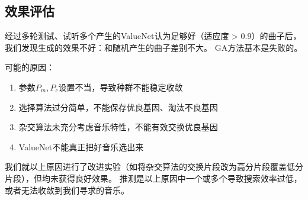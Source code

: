 \documentclass{ctexart}
\begin{document}
\subsection{效果评估}
经过多轮测试、试听多个产生的ValueNet认为足够好（适应度 > 0.9）的曲子后，我们发现生成的效果不好：和随机产生的曲子差别不大。
GA方法基本是失败的。

可能的原因：
\begin{enumerate}[nosep]
  \item 参数$P_m,P_c$设置不当，导致种群不能稳定收敛
  \item 选择算法过分简单，不能保存优良基因、淘汰不良基因
  \item 杂交算法未充分考虑音乐特性，不能有效交换优良基因
  \item ValueNet不能真正把好音乐选出来
\end{enumerate}

我们就以上原因进行了改进实验（如将杂交算法的交换片段改为高分片段覆盖低分片段），但均未获得良好效果。
推测是以上原因中一个或多个导致搜索效率过低，或者无法收敛到我们寻求的音乐。
\end{document}

